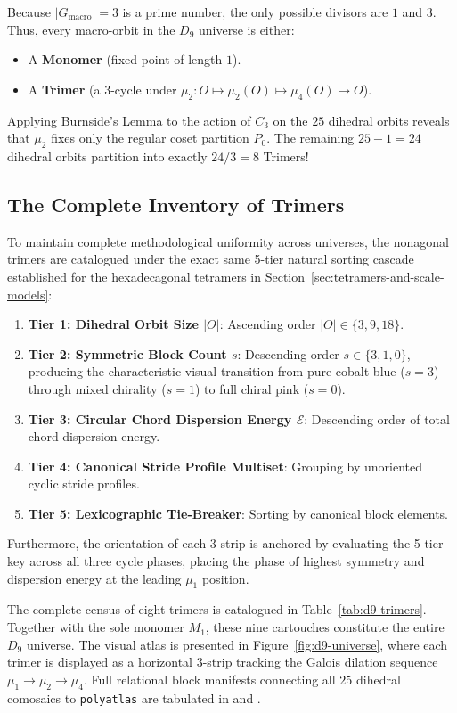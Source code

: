 Because $|G_{\text{macro}}| = 3$ is a prime number, the only possible divisors are $1$ and $3$. Thus, every macro-orbit in the $D_9$ universe is either:
\begin{itemize}
    \item A \textbf{Monomer} (fixed point of length $1$).
    \item A \textbf{Trimer} (a 3-cycle under $\mu_2 \colon O \mapsto \mu_2(O) \mapsto \mu_4(O) \mapsto O$).
\end{itemize}
Applying Burnside's Lemma to the action of $C_3$ on the $25$ dihedral orbits reveals that $\mu_2$ fixes only the regular coset partition $P_0$. The remaining $25 - 1 = 24$ dihedral orbits partition into exactly $24 / 3 = 8$ Trimers!

\subsection{The Complete Inventory of Trimers}

To maintain complete methodological uniformity across universes, the nonagonal trimers are catalogued under the exact same 5-tier natural sorting cascade established for the hexadecagonal tetramers in Section~\ref{sec:tetramers-and-scale-models}:
\begin{enumerate}
    \item \textbf{Tier 1: Dihedral Orbit Size $|O|$}: Ascending order $|O| \in \{3, 9, 18\}$.
    \item \textbf{Tier 2: Symmetric Block Count $s$}: Descending order $s \in \{3, 1, 0\}$, producing the characteristic visual transition from pure cobalt blue ($s=3$) through mixed chirality ($s=1$) to full chiral pink ($s=0$).
    \item \textbf{Tier 3: Circular Chord Dispersion Energy $\mathcal{E}$}: Descending order of total chord dispersion energy.
    \item \textbf{Tier 4: Canonical Stride Profile Multiset}: Grouping by unoriented cyclic stride profiles.
    \item \textbf{Tier 5: Lexicographic Tie-Breaker}: Sorting by canonical block elements.
\end{enumerate}
Furthermore, the orientation of each 3-strip is anchored by evaluating the 5-tier key across all three cycle phases, placing the phase of highest symmetry and dispersion energy at the leading $\mu_1$ position.

The complete census of eight trimers is catalogued in Table~\ref{tab:d9-trimers}. Together with the sole monomer $M_1$, these nine cartouches constitute the entire $D_9$ universe. The visual atlas is presented in Figure~\ref{fig:d9-universe}, where each trimer is displayed as a horizontal 3-strip tracking the Galois dilation sequence $\mu_1 \to \mu_2 \to \mu_4$. Full relational block manifests connecting all $25$ dihedral comosaics to \texttt{polyatlas} are tabulated in  and .

